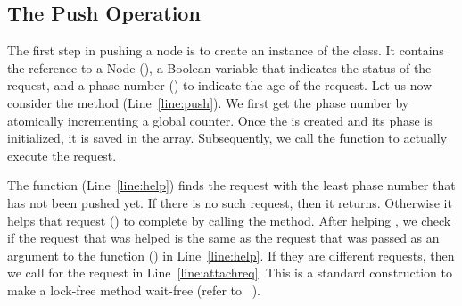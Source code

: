 \documentclass{llncs}
\begin{document}
\vspace{-4mm}

\subsection{The Push Operation}
The first step in pushing a node is to create an instance of the  class. It contains the 
reference to a Node (), a Boolean variable  that indicates the status of the 
request, and a phase number () to indicate the age of the request.
Let us now consider the  method (Line~\ref{line:push}).
 We first get the phase number by atomically incrementing a global counter. 
Once the  is created and its phase is initialized, it is saved in the  array. 
Subsequently, we call the function  to actually execute the  request. 

The  function (Line~\ref{line:help}) finds the request with the least phase number that has 
not been pushed yet. If there is no such request, then it returns. Otherwise it helps that request 
() to complete by calling the  method. After helping , we check if the request that was helped is the same as the request that was 
passed as an argument to the  function () in Line~\ref{line:help}. If they are 
different requests, then we call  for the request  in Line~\ref{line:attachreq}. 
This is a standard construction to make a lock-free method wait-free (refer to ~\cite{artOfMulti}).
\end{document}
